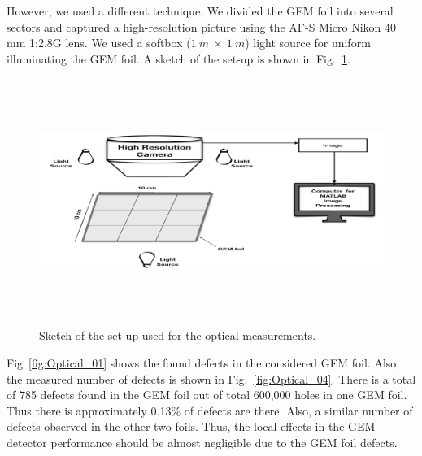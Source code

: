 However, we used a different technique.
We divided the GEM foil into several sectors and captured a high-resolution picture using the AF-S Micro Nikon 40 mm 1:2.8G lens.
We used a softbox ($1~m~\times~1~m$) light source for uniform illuminating the GEM foil.
A sketch of the set-up is shown in Fig.~\ref{fig:Optical_Sketch}.
\begin{figure}[!htbp]
    \centering
        \includegraphics[width=12cm, height=8cm]{figures/GEM/figures/2.jpeg}
   \caption{Sketch of the set-up used for the optical measurements.}   \label{fig:Optical_Sketch}
\end{figure}
Fig~\ref{fig:Optical_01} shows the found defects in the considered GEM foil. Also, the measured number of defects is shown in Fig.~\ref{fig:Optical_04}. There is a total of 785 defects found in the GEM foil out of total 600,000 holes in one GEM foil.
Thus there is approximately 0.13\% of defects are there.
Also, a similar number of defects observed in the other two foils. Thus, the local effects in the GEM detector performance should be almost negligible due to the GEM foil defects.

